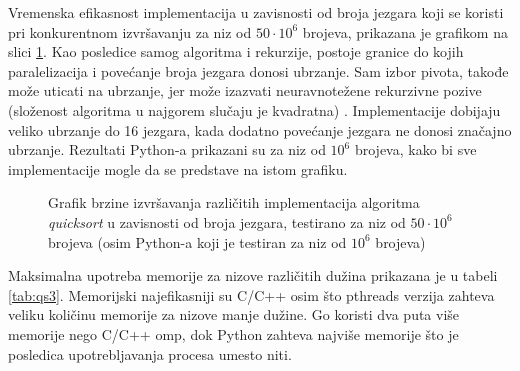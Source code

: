 \documentclass[12pt,oneside]{memoir}
\begin{document}
Vremenska efikasnost implementacija u zavisnosti od broja jezgara koji se koristi pri konkurentnom izvršavanju za niz od $50\cdot10^{6}$ brojeva, prikazana je grafikom na slici \ref{fig:qs1}. Kao posledice samog algoritma i rekurzije, postoje granice do kojih paralelizacija i povećanje broja jezgara donosi ubrzanje. Sam izbor pivota, takođe može uticati na ubrzanje, jer može izazvati neuravnotežene rekurzivne pozive (složenost algoritma u najgorem slučaju je kvadratna) \cite{qsp}. Implementacije dobijaju veliko ubrzanje do 16 jezgara, kada dodatno povećanje jezgara ne donosi značajno ubrzanje. Rezultati Python-a prikazani su za niz od $10^{6}$  brojeva, kako bi sve implementacije mogle da se predstave na istom grafiku.

\begin{figure}
\begin{center}


\caption{Grafik brzine izvršavanja različitih implementacija algoritma \textit{quicksort} u zavisnosti od broja jezgara, testirano za niz od $50\cdot10^{6}$  brojeva (osim Python-a koji je testiran za niz od $10^{6}$ brojeva)}
\label{fig:qs1}
\end{center}
\end{figure}

Maksimalna upotreba memorije za nizove različitih dužina prikazana je u tabeli \ref{tab:qs3}. Memorijski najefikasniji su C/C++ osim što pthreads verzija zahteva veliku količinu memorije za nizove manje dužine. Go koristi dva puta više memorije nego C/C++ omp, dok Python zahteva najviše memorije što je posledica upotrebljavanja procesa umesto niti. 
\end{document}
